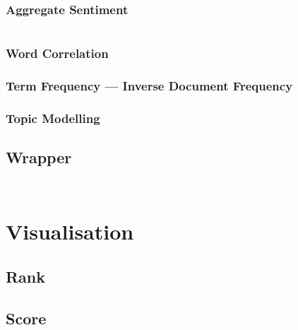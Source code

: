 \documentclass[11pt, a4paper, oneside]{report}
\begin{document}
\subsubsection{Aggregate Sentiment}\label{sec:aggregate-sentiment}

\inputminted[frame=lines,fontsize=\scriptsize,xleftmargin=\parindent,linenos]{R}{R/aggregate-sentiment.R}

\subsubsection{Word Correlation}\label{sec:word-correlation}

\subsubsection{Term Frequency --- Inverse Document Frequency}\label{sec:term-freq-inverse}

\subsubsection{Topic Modelling}\label{sec:topic-modelling}

\subsection{Wrapper}\label{sec:wrapper}

\inputminted[frame=lines,fontsize=\scriptsize,xleftmargin=\parindent,linenos]{R}{R/get-insight.R}

\inputminted[frame=lines,fontsize=\scriptsize,xleftmargin=\parindent,linenos]{R}{R/insight-aggregate.R}

\section{Visualisation}\label{sec:visualisation}

\subsection{Rank}\label{sec:rank}

\subsection{Score}\label{sec:score}
\end{document}
